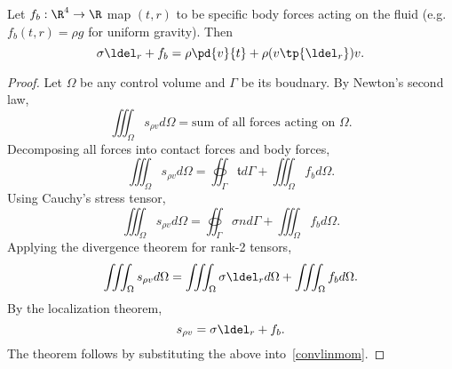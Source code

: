\begin{thm}
    Let $f_b:\R^4\to \R$ map $(t,r)$ to be specific body forces acting on the fluid
    (e.g. $f_b(t,r)=\rho g$ for uniform gravity).
    Then
    \begin{equation}
        \label{cauchymom}
        \sigma \ldel_r + f_b = \rho \pd{v}{t} + \rho (v \tp{\ldel_r}) v.
    \end{equation}
\end{thm}

\begin{proof}
    Let $\Omega$ be any control volume and $\Gamma$ be its boudnary.  By Newton's second law,
    \begin{equation}
        \iiint_\Omega s_{\rho v} d\Omega = \text{sum of all forces acting on $\Omega$}.
    \end{equation}
    Decomposing all forces into contact forces and body forces,
    \begin{equation}
        \iiint_\Omega s_{\rho v} d\Omega = \oiint_\Gamma \mathfrak{t} d\Gamma + \iiint_\Omega f_b d\Omega.
    \end{equation}
    Using Cauchy's stress tensor,
    \begin{equation}
        \iiint_\Omega s_{\rho v} d\Omega = \oiint_\Gamma \sigma n d\Gamma + \iiint_\Omega f_b d\Omega.
    \end{equation}
    Applying the divergence theorem for rank-2 tensors,
    \begin{equation}
        \iiint_\Omega s_{\rho v} d\Omega = \iiint_\Omega \sigma \ldel_r d\Omega + \iiint_\Omega f_b d\Omega.
    \end{equation}
    By the localization theorem, 
    \begin{equation}
        s_{\rho v} = \sigma \ldel_r + f_b.
    \end{equation}
The theorem follows by substituting the above into~\autoref{convlinmom}.
\end{proof}

%

